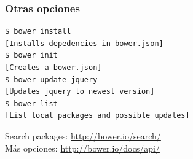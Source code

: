 \begin{frame}[fragile]
\frametitle{Otras opciones}

{\Large
\begin{verbatim}
$ bower install
[Installs depedencies in bower.json]
$ bower init
[Creates a bower.json]
$ bower update jquery
[Updates jquery to newest version]
$ bower list
[List local packages and possible updates]
\end{verbatim}

Search packages: \url{http://bower.io/search/} \\

Más opciones: \url{http://bower.io/docs/api/} \\
}

\end{frame}

